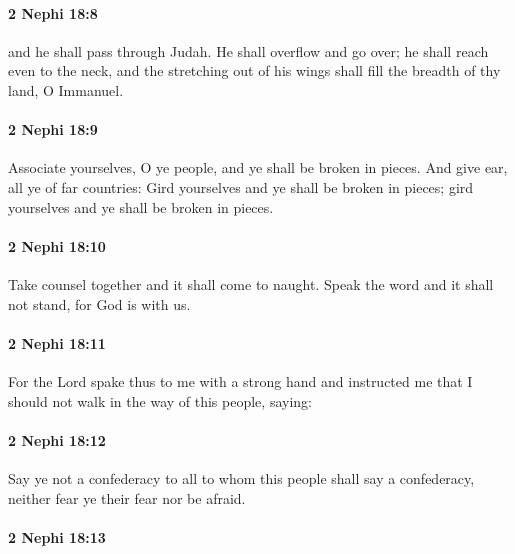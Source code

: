		\paragraph{2 Nephi 18:8} %
			\label{2NEPHI-18-8}

			and he shall pass through Judah.
			He shall overflow and go over;
			he shall reach even to the neck,
			and the stretching out of his wings shall fill the breadth of thy land, O Immanuel.

		\paragraph{2 Nephi 18:9} %
			\label{2NEPHI-18-9}

			Associate yourselves, O ye people, and ye shall be broken in pieces.
			And give ear, all ye of far countries:
			Gird yourselves and ye shall be broken in pieces;
			gird yourselves and ye shall be broken in pieces.

		\paragraph{2 Nephi 18:10} %
			\label{2NEPHI-18-10}

			Take counsel together and it shall come to naught.
			Speak the word and it shall not stand,
			for God is with us.

		\paragraph{2 Nephi 18:11} %
			\label{2NEPHI-18-11}

			For the Lord spake thus to me with a strong hand
			and instructed me that I should not walk in the way of this people, saying:

		\paragraph{2 Nephi 18:12} %
			\label{2NEPHI-18-12}

			Say ye not a confederacy
			to all to whom this people shall say a confederacy,
			neither fear ye their fear nor be afraid.

		\paragraph{2 Nephi 18:13} %
			\label{2NEPHI-18-13}

